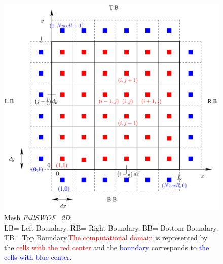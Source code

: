 \documentclass[a4paper, 11pt]{article}
\newcommand{\FullSWOF}{\emph{FullSWOF\_2D}}
\begin{document}
\begin{figure}[htbp]
\begin{center}
\includegraphics[width=12cm]{Figures_FullSWOF_2D/Maillage_FullSWOF_2D}
\caption{Mesh \FullSWOF;\protect\\ LB= Left Boundary, RB= Right Boundary, BB= Bottom Boundary, TB= Top Boundary.\newline \textcolor{red}{The computational domain} is represented by the \textcolor{red}{cells with the red center} and the \textcolor{blue}{boundary} corresponds to \textcolor{blue}{the cells with blue center}.}
\label{fig:mesh}
\end{center}
\end{figure}
\end{document}
